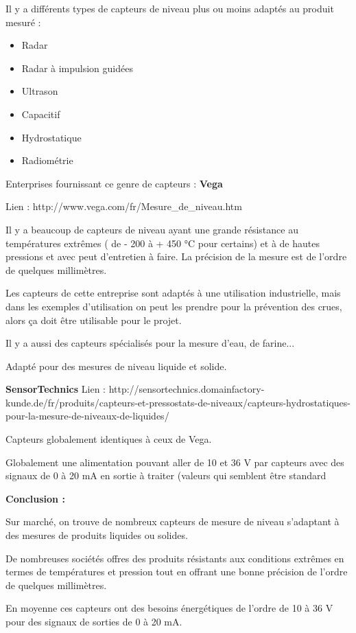 \documentclass{mise_en_page}
\begin{document}
Il y a différents types de capteurs de niveau plus ou moins adaptés au
produit mesuré :

\begin{itemize}
\item Radar
\item Radar à impulsion guidées
\item Ultrason
\item Capacitif
\item Hydrostatique
\item Radiométrie
\end{itemize}

Enterprises fournissant ce genre de capteurs :
\textbf{Vega}

Lien :
http://www.vega.com/fr/Mesure\_de\_niveau.htm

Il y a beaucoup de capteurs de niveau ayant une grande résistance au
températures extrêmes ( de - 200 à + 450 °C pour certains) et à de
hautes pressions et avec peut d'entretien à faire. La
précision de la mesure est de l’ordre de quelques millimètres.

Les capteurs de cette entreprise sont adaptés à une utilisation
industrielle, mais dans les exemples d’utilisation on peut les prendre
pour la prévention des crues, alors ça doit être utilisable pour le
projet.

Il y a aussi des capteurs spécialisés pour la mesure d’eau, de farine...

Adapté pour des mesures de niveau liquide et solide.

\textbf{SensorTechnics}
Lien : 
http://sensortechnics.domainfactory-kunde.de/fr/produits/capteurs-et-pressostats-de-niveaux/capteurs-hydrostatiques-pour-la-mesure-de-niveaux-de-liquides/

Capteurs globalement identiques à ceux de Vega.

Globalement une alimentation pouvant aller de 10 et 36 V par capteurs
avec des signaux de 0 à 20 mA en sortie à traiter (valeurs qui semblent
être standard

\textbf{Conclusion :}

Sur marché, on trouve de nombreux capteurs de mesure de niveau
s’adaptant à des mesures de produits liquides ou solides.

De nombreuses sociétés offres des produits résistants aux conditions
extrêmes en termes de températures et pression tout en offrant une
bonne précision de l’ordre de quelques millimètres.

En moyenne ces capteurs ont des besoins énergétiques de l’ordre de 10 à
36 V pour des signaux de sorties de 0 à 20 mA.
\end{document}
